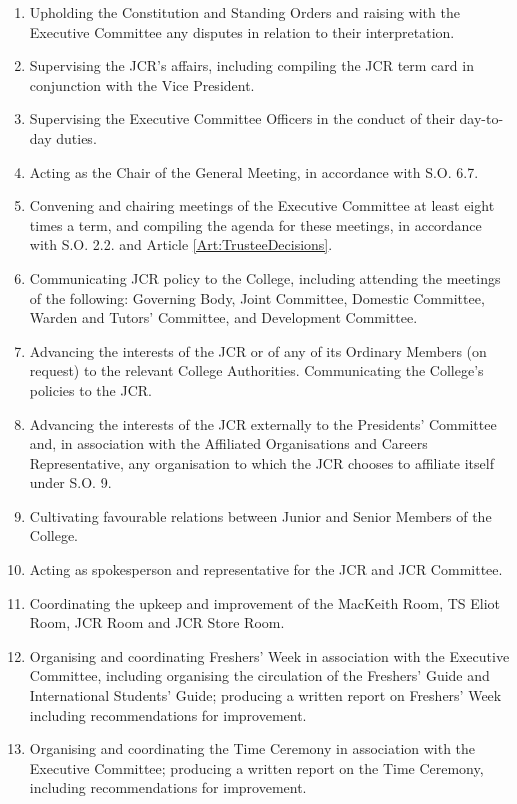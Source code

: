 \begin{enumerate}
	\item Upholding the Constitution and Standing Orders and raising with the Executive Committee any disputes in relation to their interpretation.
	\item Supervising the JCR's affairs, including compiling the JCR term card in conjunction with the Vice President.     
	\item Supervising the Executive Committee Officers in the conduct of their day-to-day duties.
	\item Acting as the Chair of the General Meeting, in accordance with S.O. 6.7.     
	\item Convening and chairing meetings of the Executive Committee at least eight times a term, and compiling the agenda for these meetings, in accordance with S.O. 2.2. and Article \ref{Art:TrusteeDecisions}.
	\item Communicating JCR policy to the College, including attending the meetings of the following: Governing Body, Joint Committee, Domestic Committee, Warden and Tutors' Committee, and Development Committee.
	\item Advancing the interests of the JCR or of any of its Ordinary Members (on request) to the relevant College Authorities.
	Communicating the College's policies to the JCR.     
	\item Advancing the interests of the JCR externally to the Presidents' Committee and, in association with the Affiliated Organisations and Careers Representative, any organisation to which the JCR chooses to affiliate itself under S.O. 9.
	\item Cultivating favourable relations between Junior and Senior Members of the College.
	\item Acting as spokesperson and representative for the JCR and JCR Committee.
	\item Coordinating the upkeep and improvement of the MacKeith Room, TS Eliot Room, JCR Room and JCR Store Room.
	\item Organising and coordinating Freshers' Week in association with the Executive Committee, including organising the circulation of the Freshers' Guide and International Students' Guide; producing a written report on Freshers' Week including recommendations for improvement.
	\item Organising and coordinating the Time Ceremony in association with the Executive Committee; producing a written report on the Time Ceremony, including recommendations for improvement.

\end{enumerate}
